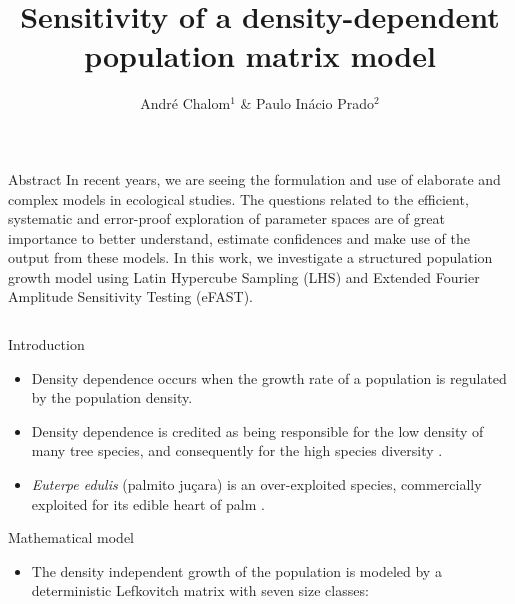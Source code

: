 \documentclass[final]{beamer}
\title{Sensitivity of a density-dependent population matrix model}
\author{Andr\'e Chalom$^1$ \& Paulo In\'acio Prado$^2$}
\institute{$^1$ Programa Interunidades de Pós-Graduação em Bioinformática, 
 $^2$ Instituto de Biociências, Universidade de São Paulo, Brasil.}
\begin{document}
  \begin{frame}{} 
    \vfill
    \begin{block}{\large Abstract}
In recent years, we are seeing the formulation and use of
elaborate and complex models in ecological studies.
The questions related to the efficient, systematic and error-proof
exploration of parameter spaces are of great importance to better understand,
estimate confidences and make use of the output from these models. 
In this work,
we investigate a structured population growth model
using Latin Hypercube Sampling (LHS) and Extended Fourier Amplitude Sensitivity
Testing (eFAST).
    \end{block}
    \vfill
    \begin{columns}[t]
      \begin{column}{.48\linewidth}
        \begin{block}{Introduction}
          \begin{itemize}
		  \item Density dependence occurs when the growth rate of a population is regulated by the population density.
          \item Density dependence is credited as being responsible for the low density of many tree species, and consequently for the high species diversity \cite{Connel71, Janzen70, wills1997}.
          \item {\em Euterpe edulis} (palmito ju\c cara) is an over-exploited species, commercially exploited for its edible heart of palm \cite{Pollak95}.
          \end{itemize}
        \end{block}
    \vfill
        \begin{block}{Mathematical model}
          \begin{itemize}
          \item The density independent growth of the population is modeled by a deterministic Lefkovitch matrix with seven size classes:
\begin{equation}

\end{equation}
\end{itemize}
\end{block}
\end{column}
\end{columns}
\end{frame}
\end{document}

